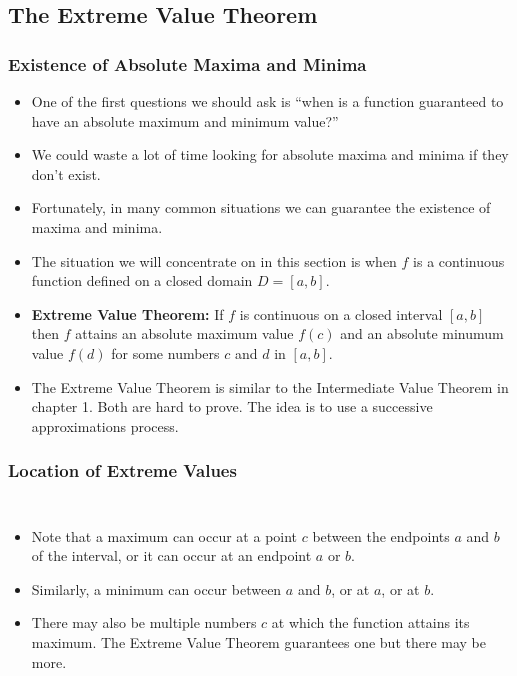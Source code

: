 \documentclass[serif,ignorenonframetext]{beamer}
\begin{document}


\subsection{The Extreme Value Theorem}

\begin{frame}
  \frametitle{Existence of Absolute Maxima and Minima}
  \begin{itemize}[<+->]
  \item One of the first questions we should ask is
    ``when is a function guaranteed to have an
    absolute maximum and minimum value?''
  \item We could waste a lot of time looking for absolute maxima and minima
    if they don't exist.
  \item Fortunately, in many common situations we can guarantee the
    existence of maxima and minima.
  \item The situation we will concentrate on in this section is when $f$
    is a continuous function defined on a closed domain $D=[a,b]$.
  \item \textbf{Extreme Value Theorem:} If $f$ is continuous on a closed
    interval $[a,b]$ then $f$ attains an absolute maximum value $f(c)$
    and an absolute minumum value $f(d)$ for some numbers $c$ and $d$ 
    in $[a,b]$.
  \item The Extreme Value Theorem is similar to the Intermediate Value
    Theorem in chapter 1.  Both are hard to prove.  The idea is to use
    a successive approximations process.
  \end{itemize}
\end{frame}

\begin{frame}
  \frametitle{Location of Extreme Values}
  \begin{columns}
  \begin{itemize}[<+->]
  \item Note that a maximum can occur at a point $c$ between the 
    endpoints $a$ and $b$ of the interval, or it can occur at an endpoint
    $a$ or $b$.
  \item Similarly, a minimum can occur between $a$ and $b$, or at $a$, or
    at $b$.
  \item There may also be multiple numbers $c$ at which the function attains
    its maximum.  The Extreme Value Theorem guarantees one but there may
    be more.
  \end{itemize}
  \end{columns}
\end{frame}
\end{document}
